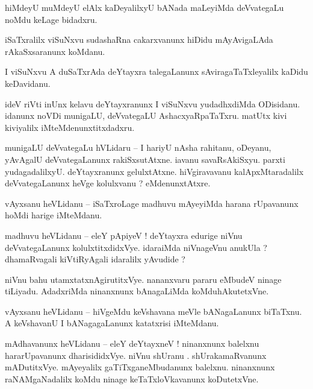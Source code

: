 \documentclass{article}
\begin{document}
\begin{mng}%
hiMdeyU muMdeyU elAlx kaDeyalilxyU bANada maLeyiMda deVvategaLu noMdu keLage bidadxru.
\end{mng}

\begin{mng}%
iSaTxralilx viSuNxvu sudashaRna cakarxvanunx hiDidu mAyAvigaLAda rAkaSxsaranunx koMdanu.
\end{mng}

\begin{mng}%
I viSuNxvu A duSaTxrAda deYtayxra talegaLanunx sAviragaTaTxleyalilx kaDidu keDavidanu.
\end{mng}

\begin{mng}%
ideV riVti inUnx kelavu deYtayxranunx I viSuNxvu yudadhxdiMda ODisidanu. idanunx noVDi munigaLU, 
deVvategaLU AshacxyaRpaTaTxru. matUtx kivi kiviyalilx iMteMdenunxtitxdadxru.
\end{mng}

\begin{mng}%
munigaLU deVvategaLu hVLidaru -- I hariyU nAsha rahitanu, oDeyanu, yAvAgalU deVvategaLanunx 
rakiSxsutAtxne. iavanu savaRsAkiSxyu. parxti yudagadalilxyU. deYtayxranunx gelulxtAtxne. 
hiVgiravavanu kalApxMtaradalilx deVvategaLanunx heVge kolulxvanu ? eMdenunxtAtxre.
\end{mng}

\begin{mng}%
vAyxsanu heVLidanu -- iSaTxroLage madhuvu mAyeyiMda harana rUpavanunx hoMdi harige iMteMdanu.
\end{mng}

\begin{mng}%
madhuvu heVLidanu -- eleY pApiyeV ! deYtayxra edurige niVnu deVvategaLanunx kolulxtitxdidxVye. 
idaraiMda niVnageVnu anukUla ? dhamaRvagali kiVtiRyAgali idaralilx yAvudide ?
\end{mng}

\begin{mng}%
niVnu bahu utamxtatxnAgirutitxVye. nananxvaru pararu eMbudeV ninage tiLiyadu. AdadxriMda ninanxnunx 
bAnagaLiMda koMduhAkutetxVne.
\end{mng}

\begin{mng}%
vAyxsanu heVLidanu -- hiVgeMdu keVshavana meVle bANagaLanunx biTaTxnu. A keVshavanU I 
bANagagaLanunx katatxrisi iMteMdanu.
\end{mng}

\begin{mng}%
mAdhavanunx heVLidanu -- eleY deYtayxneV ! ninanxnunx balelxnu hararUpavanunx dharisididxVye. niVnu 
shUranu . shUrakamaRvanunx mADutitxVye. mAyeyalilx gaTiTxganeMbudanunx balelxnu. ninanxnunx 
raNAMgaNadalilx koMdu ninage keTaTxloVkavanunx koDutetxVne.
\end{mng}
\end{document}
